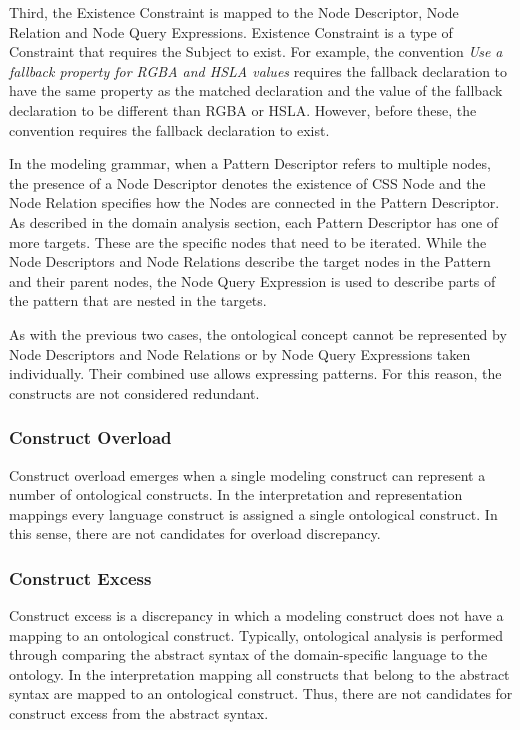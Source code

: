 Third, the Existence Constraint is mapped to the Node Descriptor, Node
Relation and Node Query Expressions. Existence Constraint is a type of
Constraint that requires the Subject to exist. For example, the convention
\textit{Use a fallback property for RGBA and HSLA values} requires the
fallback declaration to have the same property as the matched declaration and
the value of the fallback declaration to be different than RGBA or HSLA.
However, before these, the convention requires the fallback declaration to
exist.

In the modeling grammar, when a Pattern Descriptor refers to multiple nodes,
the presence of a Node Descriptor denotes the existence of CSS Node and the
Node Relation specifies how the Nodes are connected in the Pattern Descriptor.
As described in the domain analysis section, each Pattern Descriptor has one
of more targets. These are the specific nodes that need to be iterated. While
the Node Descriptors and Node Relations describe the target nodes in the
Pattern and their parent nodes, the Node Query Expression is used to describe
parts of the pattern that are nested in the targets.

As with the previous two cases, the ontological concept cannot be represented
by Node Descriptors and Node Relations or by Node Query Expressions taken
individually. Their combined use allows expressing patterns. For this reason,
the constructs are not considered redundant.


\subsubsection{Construct Overload}

Construct overload emerges when a single modeling construct can represent a
number of ontological constructs. In the interpretation and representation
mappings every language construct is assigned a single ontological construct.
In this sense, there are not candidates for overload discrepancy.

\subsubsection{Construct Excess}

Construct excess is a discrepancy in which a modeling construct does not have
a mapping to an ontological construct. Typically, ontological analysis is
performed through comparing the abstract syntax of the domain-specific
language to the ontology. In the interpretation mapping all constructs that
belong to the abstract syntax are mapped to an ontological construct. Thus,
there are not candidates for construct excess from the abstract syntax.

